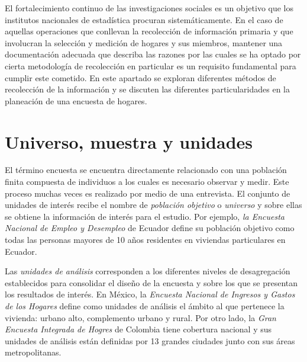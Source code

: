 El fortalecimiento continuo de las investigaciones sociales es un objetivo que los institutos nacionales de estadística procuran sistemáticamente. En el caso de aquellas operaciones que conllevan la recolección de información primaria y que involucran la selección y medición de hogares y sus miembros, mantener una documentación adecuada que describa las razones por las cuales se ha optado por cierta metodología de recolección en particular es un requisito fundamental para cumplir este cometido. En este apartado se exploran diferentes métodos de recolección de la información y se discuten las diferentes particularidades en la planeación de una encuesta de hogares.

\hypertarget{universo-muestra-y-unidades}{%
\section{Universo, muestra y unidades}\label{universo-muestra-y-unidades}}

El término encuesta se encuentra directamente relacionado con una población finita compuesta de individuos a los cuales es necesario observar y medir. Este proceso muchas veces es realizado por medio de una entrevista. El conjunto de unidades de interés recibe el nombre de \emph{población objetivo} o \emph{universo} y sobre ellas se obtiene la información de interés para el estudio. Por ejemplo, \emph{la Encuesta Nacional de Empleo y Desempleo} de Ecuador define su población objetivo como todas las personas mayores de 10 años residentes en viviendas particulares en Ecuador.

Las \emph{unidades de análisis} corresponden a los diferentes niveles de desagregación establecidos para consolidar el diseño de la encuesta y sobre los que se presentan los resultados de interés. En México, la \emph{Encuesta Nacional de Ingresos y Gastos de los Hogares} define como unidades de análisis el ámbito al que pertenece la vivienda: urbano alto, complemento urbano y rural. Por otro lado, la \emph{Gran Encuesta Integrada de Hogres} de Colombia tiene cobertura nacional y sus unidades de análisis están definidas por 13 grandes ciudades junto con sus áreas metropolitanas.

